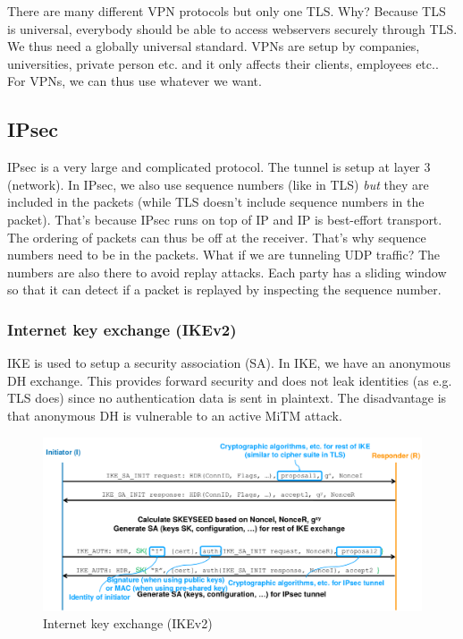 \documentclass[11pt,oneside,a4paper]{article}
\begin{document}
There are many different VPN protocols but only one TLS. Why?
Because TLS is universal, everybody should be able to access webservers securely through TLS.  We thus need a globally universal standard. VPNs are setup by companies, universities, private person etc. and it only affects their clients, employees etc.. For VPNs, we can thus use whatever we want.

\subsection{IPsec}

IPsec is a very large and complicated protocol. The tunnel is setup at layer 3 (network). In IPsec, we also use sequence numbers (like in TLS) \textit{but} they are included in the packets (while TLS doesn't include sequence numbers in the packet). That's because IPsec runs on top of IP and IP is best-effort transport. The ordering of packets can thus be off at the receiver. That's why sequence numbers need to be in the packets. What if we are tunneling UDP traffic?
The numbers are also there to avoid replay attacks. Each party has a sliding window so that it can
detect if a packet is replayed by inspecting the sequence number.

\subsubsection{Internet key exchange (IKEv2)}

IKE is used to setup a security association (SA). In IKE, we have an anonymous DH exchange. This provides forward security and does not leak identities (as e.g. TLS does) since no authentication data is sent in plaintext. The disadvantage is that anonymous DH is vulnerable to an active MiTM attack.

\begin{figure}[t!]
	\centering
	\includegraphics[width=0.9\linewidth]{figures/ikev2}
	\caption{Internet key exchange (IKEv2)}
	\label{fig:ikev2}
\end{figure}
\end{document}
